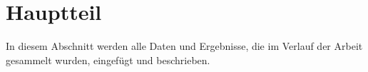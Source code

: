 \chapter{Hauptteil}
\label{cha:Hauptteil}

In diesem Abschnitt werden alle Daten und Ergebnisse, die im Verlauf der Arbeit gesammelt wurden, eingef\"ugt und beschrieben.
